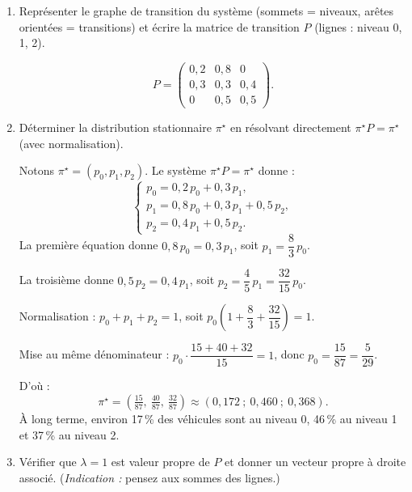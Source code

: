 \medskip
\begin{enumerate}[label=\alph*), itemsep=0.6em]
  \item Représenter le graphe de transition du système (sommets = niveaux, arêtes orientées = transitions) et écrire la matrice de transition $P$ (lignes : niveau 0, 1, 2).

\begin{solution}
\[
  P = \begin{pmatrix}
    0{,}2 & 0{,}8 & 0 \\
    0{,}3 & 0{,}3 & 0{,}4 \\
    0 & 0{,}5 & 0{,}5
  \end{pmatrix}.
\]
\end{solution}

  \item Déterminer la distribution stationnaire $\pi^\star$ en résolvant directement $\pi^\star P = \pi^\star$ (avec normalisation).

\begin{solution}
Notons $\pi^\star = (p_0, p_1, p_2)$. Le système $\pi^\star P = \pi^\star$ donne :
\[
\begin{cases}
  p_0 = 0{,}2\, p_0 + 0{,}3\, p_1, \\
  p_1 = 0{,}8\, p_0 + 0{,}3\, p_1 + 0{,}5\, p_2, \\
  p_2 = 0{,}4\, p_1 + 0{,}5\, p_2.
\end{cases}
\]
La première équation donne $0{,}8\, p_0 = 0{,}3\, p_1$, soit $p_1 = \dfrac{8}{3}\, p_0$.

La troisième donne $0{,}5\, p_2 = 0{,}4\, p_1$, soit $p_2 = \dfrac{4}{5}\, p_1 = \dfrac{32}{15}\, p_0$.

Normalisation : $p_0 + p_1 + p_2 = 1$, soit $p_0\left(1 + \dfrac{8}{3} + \dfrac{32}{15}\right) = 1$.

Mise au même dénominateur : $p_0 \cdot \dfrac{15 + 40 + 32}{15} = 1$, donc $p_0 = \dfrac{15}{87} = \dfrac{5}{29}$.

D'où :
\[
  \pi^\star = \left( \tfrac{15}{87},\ \tfrac{40}{87},\ \tfrac{32}{87} \right) \approx (0{,}172\ ;\ 0{,}460\ ;\ 0{,}368).
\]
À long terme, environ 17\,\% des véhicules sont au niveau 0, 46\,\% au niveau 1 et 37\,\% au niveau 2.
\end{solution}

  \item Vérifier que $\lambda = 1$ est valeur propre de $P$ et donner un vecteur propre à droite associé. (\emph{Indication :} pensez aux sommes des lignes.)


\end{enumerate}
